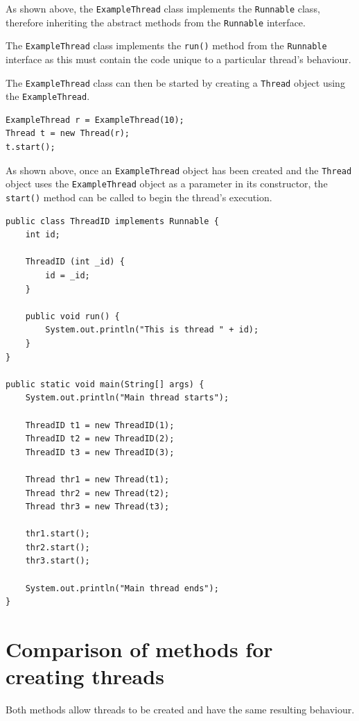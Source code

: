 \documentclass[a4paper]{systems-software}
\begin{document}
As shown above, the \texttt{ExampleThread} class implements the \texttt{Runnable} class, therefore inheriting the abstract methods from the \texttt{Runnable} interface.

The \texttt{ExampleThread} class implements the \texttt{run()} method from the \texttt{Runnable} interface as this must contain the code unique to a particular thread's behaviour.

The \texttt{ExampleThread} class can then be started by creating a \texttt{Thread} object using the \texttt{ExampleThread}.

\begin{lstlisting}[title={Creating an instance of a Thread by using ExampleThread.}]
ExampleThread r = ExampleThread(10);
Thread t = new Thread(r);
t.start();
\end{lstlisting}

As shown above, once an \texttt{ExampleThread} object has been created and the \texttt{Thread} object uses the \texttt{ExampleThread} object as a parameter in its constructor, the \texttt{start()} method can be called to begin the thread's execution.

\newpage

\begin{lstlisting}[title={Example of implementing the Runnable interface.}]
public class ThreadID implements Runnable {
	int id;
	
	ThreadID (int _id) {
		id = _id;
	}
	
	public void run() {
		System.out.println("This is thread " + id);
	}
}

public static void main(String[] args) {
	System.out.println("Main thread starts");
	
	ThreadID t1 = new ThreadID(1);
	ThreadID t2 = new ThreadID(2);
	ThreadID t3 = new ThreadID(3);
	
	Thread thr1 = new Thread(t1);
	Thread thr2 = new Thread(t2);
	Thread thr3 = new Thread(t3);
	
	thr1.start();
	thr2.start();
	thr3.start();
	
	System.out.println("Main thread ends");
}
\end{lstlisting}


\newpage

\section*{Comparison of methods for creating threads}

Both methods allow threads to be created and have the same resulting behaviour.
\end{document}
